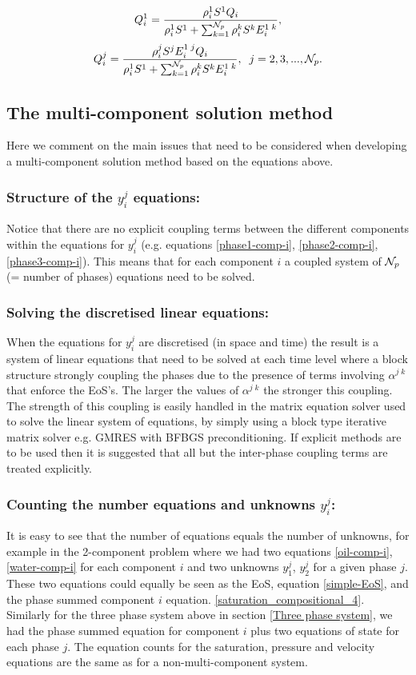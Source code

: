 \begin{eqnarray}
Q_i^1= \frac{\rho_i^1 S^1 Q_i}
{\rho_i^1 S^1 +\sum_{k=1}^{{\cal N}_p} \rho_i^k S^k E_i^{1\; k} },
\label{Qi1}
\end{eqnarray}
\begin{eqnarray}
Q_i^j= \frac{\rho_i^j S^j E_i^{1\; j} Q_i}
{\rho_i^1 S^1 +\sum_{k=1}^{{\cal N}_p} \rho_i^k S^k E_i^{1\; k} }, \;\; j=2,3,..., {{\cal N}_p}.
\label{Qi2}
\end{eqnarray}


\subsection{The multi-component solution method}
Here we comment on the main issues that need to be
considered when developing
a multi-component solution method based on
the equations above.
\subsubsection{Structure of the $y_i^j$ equations:} Notice that there
are no explicit
coupling terms between the different components within the equations
for $y_i^j$ (e.g. equations \ref{phase1-comp-i}, \ref{phase2-comp-i}, \ref{phase3-comp-i}).
This means that for each component $i$ a coupled system of ${\cal N}_p$ (= number of phases) equations need to be solved.
\subsubsection{Solving the discretised linear equations:} When the
equations for $y_i^j$ are discretised (in space and time) the
result is a system of linear  equations that need to be solved at each time level where a block structure strongly coupling the phases due to the presence of terms involving $\alpha^{j\;k}$ that enforce the EoS's.
The larger the values of $\alpha^{j\;k}$ the
stronger this coupling. The strength of this coupling is easily
handled in the matrix equation solver used to solve the linear system of equations, by simply using a block type iterative matrix solver e.g. GMRES with BFBGS preconditioning.
If explicit methods are to be used then it is suggested
that all but the inter-phase coupling terms are treated explicitly.


\subsubsection{Counting the number equations and unknowns $y_i^j$:}
It is easy to see that the number of equations equals the number of unknowns, for example in the 2-component problem where we had two equations \ref{oil-comp-i}, \ref{water-comp-i} for each component $i$ and two unknowns $y_1^j$, $y_2^j$ for a given phase $j$.
These two equations could equally be seen
as the EoS, equation \ref{simple-EoS}, and the phase summed component $i$
equation.
\ref{saturation_compositional_4}.
Similarly for the three phase system above in section \ref{Three phase system},
we had the
phase summed equation for component $i$ plus two equations
of state for each phase $j$. The equation counts for the saturation, pressure
and velocity equations are the same as for a non-multi-component system.


